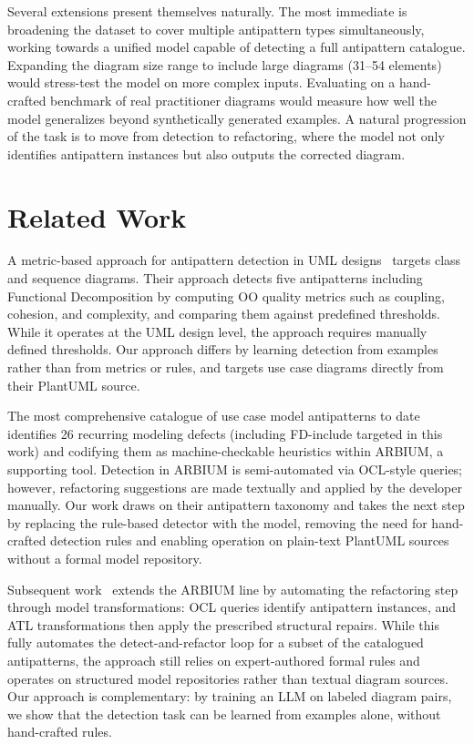 \documentclass[12pt, a4paper]{article}
\begin{document}
Several extensions present themselves naturally. The most immediate is broadening the dataset to cover multiple antipattern types simultaneously, working towards a unified model capable of detecting a full antipattern catalogue. Expanding the diagram size range to include large diagrams (31--54 elements) would stress-test the model on more complex inputs. Evaluating on a hand-crafted benchmark of real practitioner diagrams would measure how well the model generalizes beyond synthetically generated examples. A natural progression of the task is to move from detection to refactoring, where the model not only identifies antipattern instances but also outputs the corrected diagram.

\section{Related Work}
\label{sec:related}


A metric-based approach for antipattern detection in UML designs~\cite{fourati2011metric} targets class and sequence diagrams.
Their approach detects five antipatterns including Functional Decomposition
by computing OO quality metrics such as coupling, cohesion, and complexity,
and comparing them against predefined thresholds.  While it operates at the
UML design level, the approach requires manually defined thresholds.  Our approach differs by learning detection
from examples rather than from metrics or rules, and targets use case diagrams
directly from their PlantUML source.

The most comprehensive catalogue of use case model antipatterns to date~\cite{elattar2010improving} identifies 26 recurring
modeling defects (including FD-include targeted in this work) and codifying them as machine-checkable heuristics within
ARBIUM, a supporting tool.  Detection in ARBIUM is semi-automated via
OCL-style queries; however, refactoring suggestions are made textually and
applied by the developer manually.  Our work draws on their antipattern
taxonomy and takes the next step by replacing the rule-based detector with the model, removing the need for hand-crafted detection rules and
enabling operation on plain-text PlantUML sources without a formal model
repository.

Subsequent work~\cite{khan2016model} extends the ARBIUM line by
automating the refactoring step through model transformations: OCL queries
identify antipattern instances, and ATL transformations then apply the
prescribed structural repairs.  While this fully automates the
detect-and-refactor loop for a subset of the catalogued antipatterns, the
approach still relies on expert-authored formal rules and operates on
structured model repositories rather than textual diagram sources.  Our
approach is complementary: by training an LLM on labeled diagram pairs, we
show that the detection task can be learned from examples alone, without
hand-crafted rules.
\end{document}
